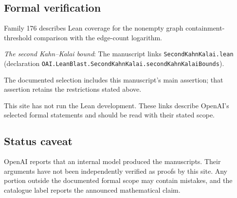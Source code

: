 \documentclass[11pt]{article}
\begin{document}
\subsection{Formal verification}
Family 176 describes Lean coverage for the nonempty graph containment-threshold comparison with the edge-count logarithm.

\textit{The second Kahn--Kalai bound}: The manuscript links \texttt{SecondKahnKalai.lean} (declaration \texttt{OAI.LeanBlast.SecondKahnKalai.secondKahnKalaiBounds}).

The documented selection includes this manuscript’s main assertion; that assertion retains the restrictions stated above.

This site has not run the Lean development. These links describe OpenAI’s selected formal statements and should be read with their stated scope.

\subsection{Status caveat}
OpenAI reports that an internal model produced the manuscripts. Their arguments have not been independently verified as proofs by this site. Any portion outside the documented formal scope may contain mistakes, and the catalogue label reports the announced mathematical claim.
\end{document}
